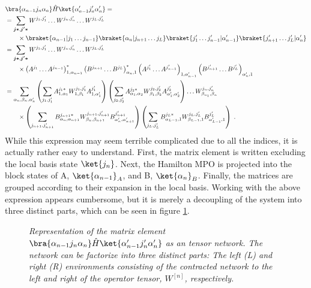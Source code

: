 \begin{align}
&	\bra{\alpha_{n-1} j_n \alpha_{n}} \hat{H} \ket{\alpha_{n-1} ' j_n ' \alpha_{n} '} = \nonumber \\
 &= \sum_{\boldsymbol{j *} , \boldsymbol{j' * }}  W^{j_1 , j_1 '} \ldots W^{j_n , j_n '} \ldots W^{j_L , j_L '} \nonumber \\
	& \qquad \times \braket{\alpha_{n-1} | j_1 \ldots j_{n-1}} \braket{\alpha_{n} | j_{n+1} \ldots j_{L}} \braket{j_1 ' \ldots j_{n-1} ' | \alpha_{n-1} '} \braket{j_{n+1} ' \ldots j_{L} ' | \alpha_{n} '} \nonumber \\
	&= \sum_{\boldsymbol{j *} , \boldsymbol{j' * }}  W^{j_1 , j_1 '} \ldots W^{j_n , j_n '} \ldots W^{j_L , j_L '} \nonumber \\
	& \qquad \times \left( A^{j_1} \ldots A^{j_{n-1}} \right)_{1 , \alpha_{n-1}}^{*} \left( B^{j_{n+1}} \ldots B^{j_{L}} \right)_{ \alpha_{n} , 1}^{*} \left( A^{j_1 '} \ldots A^{j_{n-1} '} \right)_{1 , \alpha_{n-1} '} \left( B^{j_{n+1} '} \ldots B^{j_{L} '} \right)_{ \alpha_{n} ' , 1} \nonumber \\
	&= \sum_{\alpha_n , \beta_n , \alpha_n '}
	\left( \sum_{j_1 , j_1 '} A_{1 , \alpha_1}^{j_1 *} W_{1, \beta_1}^{j_1 , j_1 '} A_{1 , \alpha_1 '}^{j_1 '} \right)
	\left( \sum_{j_2 , j_2 '} A_{\alpha_1 , \alpha_2}^{j_2 *} W_{\beta_1, \beta_2}^{j_2 , j_2 '} A_{\alpha_1 ' , \alpha_2 '}^{j_2 '} \right)
	\ldots W_{\beta_{n_1}, \beta_n}^{j_n , j_n '} \nonumber \\
	& \qquad \times \left( \sum_{j_{n+1} , j_{n+1} '} B_{\alpha_n , \alpha_{n+1}}^{j_{n+1} *} W_{\beta_n, \beta_{n+1}}^{j_{n+1} , j_{n+1} '} B_{\alpha_n ', \alpha_{n+1} '}^{j_{n+1} '} \right)
	\left( \sum_{j_{L} , j_{L} '} B_{\alpha_{L-1} , 1}^{j_{L} *} W_{\beta_{L-1}, 1}^{j_{L} , j_{L} '} B_{\alpha_{L-1}' , 1 }^{j_{L} '} \right)  \; .
\end{align}  
While this expression may seem terrible complicated due to all the indices, it is actually rather easy to understand. First, the matrix element is written excluding the local basis state $\ket{j_n}$. Next, the Hamilton MPO is projected into the block states of A, $\ket{\alpha_{n-1}}_A$, and B, $\ket{\alpha_{n}}_B$. Finally, the matrices are grouped according to their expansion in the local basis. Working with the above expression appears cumbersome, but it is merely a decoupling of the system into three distinct parts, which can be seen in figure \ref{fig:singleElemHamil}.
\begin{figure}[h!]
	\centering
	
	\caption{\textit{Representation of the matrix element $\bra{\alpha_{n-1} j_n \alpha_{n}} \hat{H} \ket{\alpha_{n-1} ' j_n ' \alpha_{n} '}$ as an tensor network. The network can be factorize into three distinct parts: The left (L) and right (R) environments consisting of the contracted network to the left and right of the operator tensor, $W^[n]$, respectively.}}
	\label{fig:singleElemHamil}
\end{figure}
